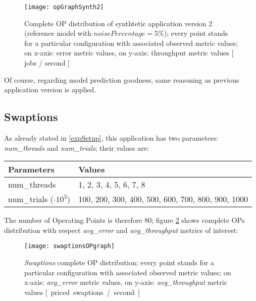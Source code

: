 \begin{figure}[H]

    \centering
    \texttt{[image: opGraphSynth2]}
    \caption{Complete OP distribution of synthtetic application version 2 (reference model with $noisePercentage = 5\%$); every point stands for a particular configuration with associated observed metric values; on x-axis: error metric values, on y-axis: throughput metric values [ jobs / second ]}
    \label{fig::opListSynth2}
    
\end{figure}

Of course, regarding model prediction goodness, same reasoning as previous application version is applied.


\subsection{Swaptions}

As already stated in \ref{expSetup}, this application has two parameters: \textit{num\_\-threads} and \textit{num\_\-trials}; their values are:

\begin{center}

    \begin{tabular}{ll}
    
        \toprule
        Parameters & Values \\
        \midrule
        num\_threads & 1, 2, 3, 4, 5, 6, 7, 8 \\
        num\_trials ($\cdot 10^3$) & 100, 200, 300, 400, 500, 600, 700, 800, 900, 1000 \\
        \bottomrule 
    
    \end{tabular}

\end{center}

The number of Operating Points is therefore 80; figure \ref{fig::swaptionsOPs} shows complete OPs distribution with respect \textit{avg\_error} and \textit{avg\_throughput} metrics of interest:

\begin{figure}[H]

    \centering
    \texttt{[image: swaptionsOPgraph]}
    \caption{\textit{Swaptions} complete OP distribution; every point stands for a particular configuration with associated observed metric values; on x-axis: \textit{avg\_error} metric values, on y-axis: \textit{avg\_throughput} metric values \hbox{[ priced swaptions / second ]}}
    \label{fig::swaptionsOPs}
    
\end{figure}





